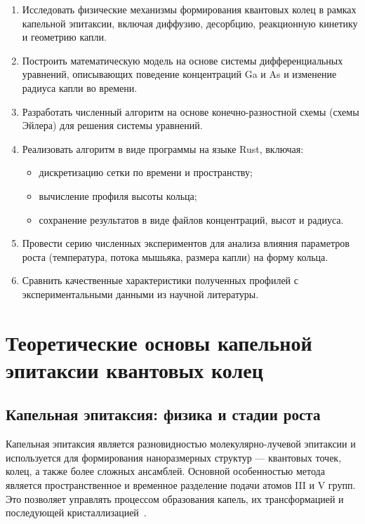 \documentclass[14pt,oneside]{extarticle}
\begin{document}
\begin{enumerate}
  \item Исследовать физические механизмы формирования квантовых колец в рамках капельной эпитаксии, включая диффузию, десорбцию, реакционную кинетику и геометрию капли.
  \item Построить математическую модель на основе системы дифференциальных уравнений, описывающих поведение концентраций Ga и As и изменение радиуса капли во времени.
  \item Разработать численный алгоритм на основе конечно-разностной схемы (схемы Эйлера) для решения системы уравнений.
  \item Реализовать алгоритм в виде программы на языке Rust, включая:
  \begin{itemize}
    \item дискретизацию сетки по времени и пространству;
    \item вычисление профиля высоты кольца;
    \item сохранение результатов в виде файлов концентраций, высот и радиуса.
  \end{itemize}
  \item Провести серию численных экспериментов для анализа влияния параметров роста (температура, потока мышьяка, размера капли) на форму кольца.
  \item Сравнить качественные характеристики полученных профилей с экспериментальными данными из научной литературы.
\end{enumerate}


\pagebreak
\section{Теоретические основы капельной эпитаксии квантовых колец}

\subsection{Капельная эпитаксия: физика и стадии роста}

Капельная эпитаксия является разновидностью молекулярно-лучевой эпитаксии и используется для формирования наноразмерных структур — квантовых точек, колец, а также более сложных ансамблей. Основной особенностью метода является пространственное и временное разделение подачи атомов III и V групп. Это позволяет управлять процессом образования капель, их трансформацией и последующей кристаллизацией~\cite{gurioli2021, koguchi1991}.
\end{document}
